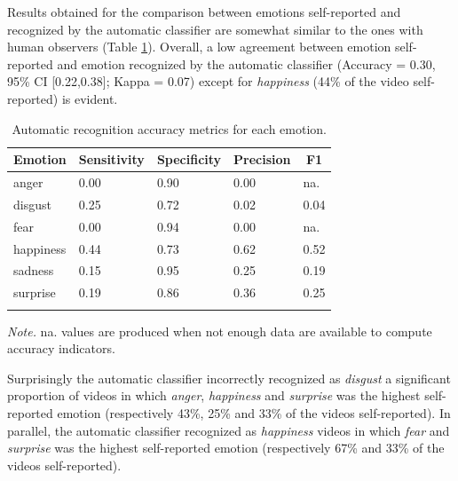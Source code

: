 \documentclass[
  english,
  doc]{apa7}
\begin{document}
Results obtained for the comparison between emotions self-reported and recognized by the automatic classifier are somewhat similar to the ones with human observers (Table \ref{tab:confusionTable-sr-ar}). Overall, a low agreement between emotion self-reported and emotion recognized by the automatic classifier (Accuracy = 0.30, 95\% CI {[}0.22,0.38{]}; Kappa = 0.07) except for \emph{happiness} (44\% of the video self-reported) is evident.

\begin{table}[tbp]

\begin{center}
\begin{threeparttable}

\caption{\label{tab:confusionTable-sr-ar}Automatic recognition accuracy metrics for each emotion.}

\begin{tabular}{lllll}
\toprule
Emotion & \multicolumn{1}{c}{Sensitivity} & \multicolumn{1}{c}{Specificity} & \multicolumn{1}{c}{Precision} & \multicolumn{1}{c}{F1}\\
\midrule
anger & 0.00 & 0.90 & 0.00 & na.\\
disgust & 0.25 & 0.72 & 0.02 & 0.04\\
fear & 0.00 & 0.94 & 0.00 & na.\\
happiness & 0.44 & 0.73 & 0.62 & 0.52\\
sadness & 0.15 & 0.95 & 0.25 & 0.19\\
surprise & 0.19 & 0.86 & 0.36 & 0.25\\
\bottomrule
\addlinespace
\end{tabular}

\begin{tablenotes}[para]
\normalsize{\textit{Note.} na. values are produced when not enough data are available to compute accuracy indicators.}
\end{tablenotes}

\end{threeparttable}
\end{center}

\end{table}

Surprisingly the automatic classifier incorrectly recognized as \emph{disgust} a significant proportion of videos in which \emph{anger}, \emph{happiness} and \emph{surprise} was the highest self-reported emotion (respectively 43\%, 25\% and 33\% of the videos self-reported). In parallel, the automatic classifier recognized as \emph{happiness} videos in which \emph{fear} and \emph{surprise} was the highest self-reported emotion (respectively 67\% and 33\% of the videos self-reported).
\end{document}
